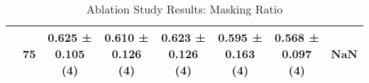 \begin{table}[htbp]
\centering
\begin{table}
\caption{Ablation Study Results: Masking Ratio}
\label{tab:masking_ratio}
\begin{tabular}{lcccccc}
\toprule
\midrule
 & 75%
 & 0.625 ± 0.105 (4) & 0.610 ± 0.126 (4) & 0.623 ± 0.126 (4) & 0.595 ± 0.163 (4) & 0.568 ± 0.097 (4) & NaN \\
\midrule
\bottomrule
\end{tabular}
\end{table}
\end{table}
